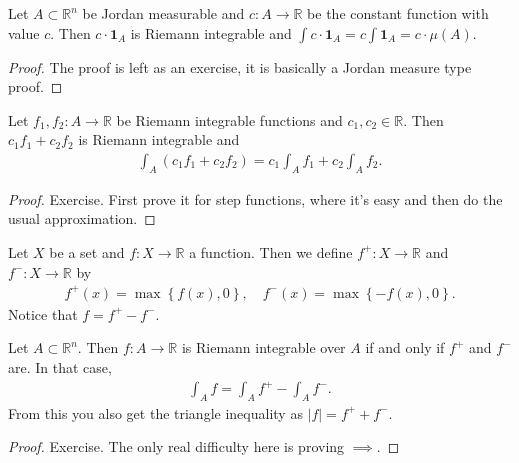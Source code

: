 \begin{lemma}\label{lem:int-const-func}
	Let $A \subset \mathbb{R}^{n}$ be Jordan measurable and $c: A \to \mathbb{R}$ be the constant function with value $c$. Then $c \cdot \boldsymbol{1}_{A}$ is Riemann integrable and $\int c \cdot \boldsymbol{1}_{A} = c \int \boldsymbol{1}_{A} = c \cdot \mu(A)$.
\end{lemma}
\begin{proof}
	The proof is left as an exercise, it is basically a Jordan measure type proof.
\end{proof}

\begin{lemma}\label{lem:lin-riemann-int}
	Let $f_{1}, f_{2}: A \to \mathbb{R}$ be Riemann integrable functions and $c_{1}, c_{2} \in \mathbb{R}$. Then $c_{1}f_{1} + c_{2}f_{2}$ is Riemann integrable and
	\begin{align*}
		\int_{A} (c_{1}f_{1} + c_{2}f_{2}) = c_{1} \int_{A} f_{1} + c_{2} \int_{A} f_{2}.
	\end{align*}
\end{lemma}
\begin{proof}
	Exercise. First prove it for step functions, where it's easy and then do the usual approximation.
\end{proof}

\begin{definition}\label{def:pos-neg-func}
	Let $X$ be a set and $f: X \to \mathbb{R}$ a function. Then we define $f^{+}: X \to \mathbb{R}$ and $f^{-}:X \to \mathbb{R}$ by
	\begin{align*}
		f^{+}(x) = \max \left\{ f(x), 0 \right\}, \quad f^{-}(x) = \max\left\{ -f(x) , 0\right\}.
	\end{align*}
	Notice that $f = f^{+} - f^{-}$.
\end{definition}

\begin{lemma}\label{lem:int-pos-neg-func}
	Let $A \subset \mathbb{R}^{n}$. Then $f: A \to \mathbb{R}$ is Riemann integrable over $A$ if and only if $f^{+}$ and $f^{-}$ are. In that case,
	\begin{align*}
		\int_{A} f = \int_{A} f^{+} - \int_{A} f^{-}.
	\end{align*}
	From this you also get the triangle inequality as $\left| f \right| = f^{+} + f^{-}$. 
\end{lemma}
\begin{proof}
	Exercise. The only real difficulty here is proving $\implies$.
\end{proof}

